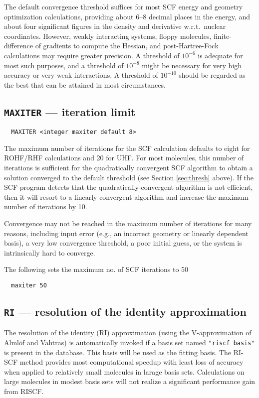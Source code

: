 The default convergence threshold suffices for most SCF energy and
geometry optimization calculations, providing about 6--8 decimal
places in the energy, and about four significant figures in the
density and derivative w.r.t.\ nuclear coordinates.  However, weakly
interacting systems, floppy molecules, finite-difference of gradients
to compute the Hessian, and post-Hartree-Fock calculations may require
greater precision.  A threshold of $10^{-6}$ is adequate for most such
purposes, and a threshold of $10^{-8}$ might be necessary for very
high accuracy or very weak interactions.  A threshold of $10^{-10}$
should be regarded as the best that can be attained in most
circumstances.

\subsection{{\tt MAXITER} --- iteration limit}
\label{sec:max}

\begin{verbatim}
  MAXITER <integer maxiter default 8>
\end{verbatim}

The maximum number of iterations for the SCF calculation defaults to
eight for ROHF/RHF calculations and 20 for UHF.  For most molecules,
this number of iterations is sufficient for the quadratically
convergent SCF algorithm to obtain a solution converged to the
default threshold (see Section \ref{sec:thresh} above).  If the SCF
program detects that the quadratically-convergent algorithm is not
efficient, then it will resort to a linearly-convergent algorithm and
increase the maximum number of iterations by 10.

Convergence may not be reached in the maximum number of iterations for
many reasons, including input error (e.g., an incorrect geometry or
linearly dependent basis), a very low convergence threshold, a poor
initial guess, or the system is intrinsically hard to converge. 

The following sets the maximum no. of SCF iterations to 50
\begin{verbatim}
  maxiter 50
\end{verbatim}

\subsection{{\tt RI} --- resolution of the identity approximation}
\label{sec:riscf}

The resolution of the identity (RI) approximation (using the
V-approximation of Alml\"{o}f and Vahtras) is automatically invoked if
a basis set named \verb+"riscf basis"+ is present in the database.
This basis will be used as the fitting basis.  The RI-SCF method
provides most computational speedup with least loss of accuracy when
applied to relatively small molecules in larage basis sets.
Calculations on large molecules in modest basis sets will not realize
a significant performance gain from RISCF.

